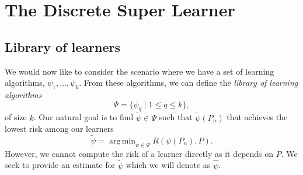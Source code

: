 \documentclass[11pt, a4paper]{article}
\DeclareMathOperator*{\argmin}{arg\,min}
\theoremstyle{definition}
\theoremstyle{remark}
\newcommand{\q}{q}
\newcommand{\ml}{k}
\newcommand{\btheta}{\theta}
\newcommand{\la}{\psi}
\newcommand{\lib}{\Psi}
\begin{document}


\section{The Discrete Super Learner}
\subsection{Library of learners}
We would now like to consider the scenario where we have a set of learning algorithms, $ \la_1, \ldots, \la_\ml $. From these algorithms, we can define the \textit{library of learning algorithms} 
$$ \lib = \{\la_{\q} \mid 1 \leq \q \leq \ml \}, $$
of size $ \ml $. Our natural goal is to find $ \tilde{\la} \in \lib $ such that $ \tilde{\la}(P_n) $ that achieves the lowest risk among our learners 
$$ \tilde{\la}  = \argmin_{\la \in \lib} R(\la(P_n) , P). $$
However, we cannot compute the risk of a learner directly as it depends on $ P $. We seek to provide an estimate for $ \tilde{\la} $ which we will denote as $ \hat{\la} $. 
\end{document}
